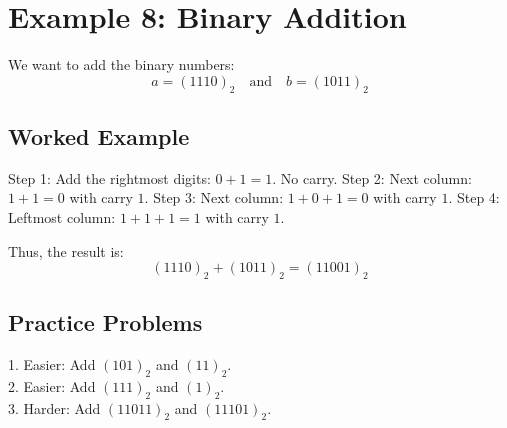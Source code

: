 \documentclass[12pt]{article}
\begin{document}
\section*{Example 8: Binary Addition}

We want to add the binary numbers:
\[
a = (1110)_2 \quad \text{and} \quad b = (1011)_2
\]

\subsection*{Worked Example}
Step 1: Add the rightmost digits: $0 + 1 = 1$. No carry.  
Step 2: Next column: $1 + 1 = 0$ with carry $1$.  
Step 3: Next column: $1 + 0 + 1 = 0$ with carry $1$.  
Step 4: Leftmost column: $1 + 1 + 1 = 1$ with carry $1$.  

Thus, the result is:
\[
(1110)_2 + (1011)_2 = (11001)_2
\]

\vspace{1em}
\subsection*{Practice Problems}

1. Easier: Add $(101)_2$ and $(11)_2$. \\[1em]
2. Easier: Add $(111)_2$ and $(1)_2$. \\[1em]
3. Harder: Add $(11011)_2$ and $(11101)_2$. \\[1em]
\end{document}
